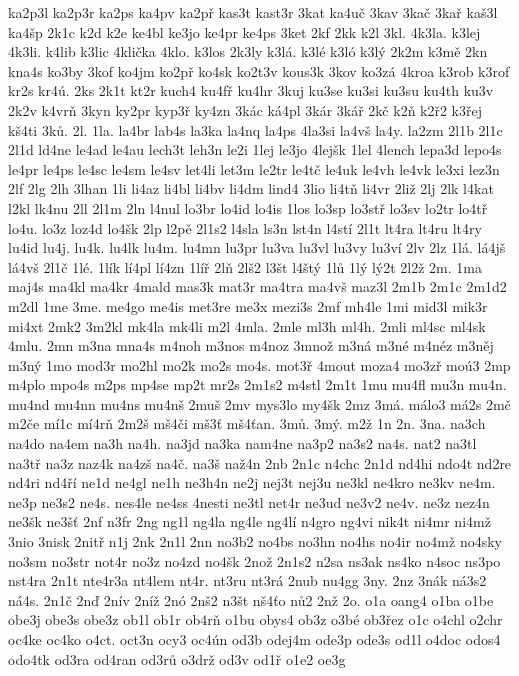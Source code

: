 {ka2p3l
ka2p3r
ka2ps
ka4pv
ka2př
kas3t
kast3r
3kat
ka4uč
3kav
3kač
3kař
kaš3l
ka4šp
2k1c
k2d
k2e
ke4bl
ke3jo
ke4pr
ke4ps
3ket
2kf
2kk
k2l
3kl.
4k3la.
k3lej
4k3li.
k4lib
k3lic
4klička
4klo.
k3los
2k3ly
k3lá.
k3lé
k3ló
k3lý
2k2m
k3mě
2kn
kna4s
ko3by
3kof
ko4jm
ko2př
ko4sk
ko2t3v
kous3k
3kov
ko3zá
4kroa
k3rob
k3rof
kr2s
kr4ú.
2ks
2k1t
kt2r
kuch4
ku4fř
ku4hr
3kuj
ku3se
ku3si
ku3su
ku4th
ku3v
2k2v
k4vrň
3kyn
ky2pr
kyp3ř
ky4zn
3kác
ká4pl
3kár
3kář
2kč
k2ň
k2ř2
k3řej
kš4ti
3ků.
2l.
1la.
la4br
lab4s
la3ka
la4nq
la4ps
4la3si
la4vš
la4y.
la2zm
2l1b
2l1c
2l1d
ld4ne
le4ad
le4au
lech3t
leh3n
le2i
1lej
le3jo
4lejšk
1lel
4lench
lepa3d
lepo4s
le4pr
le4ps
le4sc
le4sm
le4sv
let4li
let3m
le2tr
le4tč
le4uk
le4vh
le4vk
le3xi
lez3n
2lf
2lg
2lh
3lhan
1li
li4az
li4bl
li4bv
li4dm
lind4
3lio
li4tň
li4vr
2liž
2lj
2lk
l4kat
l2kl
lk4nu
2ll
2l1m
2ln
l4nul
lo3br
lo4id
lo4is
1los
lo3sp
lo3stř
lo3sv
lo2tr
lo4tř
lo4u.
lo3z
loz4d
lo4šk
2lp
l2pě
2l1s2
l4sla
ls3n
lst4n
l4stí
2l1t
lt4ra
lt4ru
lt4ry
lu4id
lu4j.
lu4k.
lu4lk
lu4m.
lu4mn
lu3pr
lu3va
lu3vl
lu3vy
lu3ví
2lv
2lz
1lá.
lá4jš
lá4vš
2l1č
1lé.
1lík
lí4pl
lí4zn
1líř
2lň
2lš2
l3št
l4štý
1lů
1lý
lý2t
2l2ž
2m.
1ma
maj4s
ma4kl
ma4kr
4mald
mas3k
mat3r
ma4tra
ma4vš
maz3l
2m1b
2m1c
2m1d2
m2dl
1me
3me.
me4go
me4is
met3re
me3x
mezi3s
2mf
mh4le
1mi
mid3l
mik3r
mi4xt
2mk2
3m2kl
mk4la
mk4li
m2l
4mla.
2mle
ml3h
ml4h.
2mli
ml4sc
ml4sk
4mlu.
2mn
m3na
mna4s
m4noh
m3nos
m4noz
3množ
m3ná
m3né
m4néz
m3něj
m3ný
1mo
mod3r
mo2hl
mo2k
mo2s
mo4s.
mot3ř
4mout
moza4
mo3zř
moú3
2mp
m4plo
mpo4s
m2ps
mp4se
mp2t
mr2s
2m1s2
m4stl
2m1t
1mu
mu4fl
mu3n
mu4n.
mu4nd
mu4nn
mu4ns
mu4nš
2muš
2mv
mys3lo
my4šk
2mz
3má.
málo3
má2s
2mč
m2če
mí1c
mí4rň
2m2š
mš4či
mš3ť
mš4ťan.
3mů.
3mý.
m2ž
1n
2n.
3na.
na3ch
na4do
na4em
na3h
na4h.
na3jd
na3ka
nam4ne
na3p2
na3s2
na4s.
nat2
na3tl
na3tř
na3z
naz4k
na4zš
na4č.
na3š
naž4n
2nb
2n1c
n4chc
2n1d
nd4hi
ndo4t
nd2re
nd4ri
nd4ří
ne1d
ne4gl
ne1h
ne3h4n
ne2j
nej3t
nej3u
ne3kl
ne4kro
ne3kv
ne4m.
ne3p
ne3s2
ne4s.
nes4le
ne4ss
4nesti
ne3tl
net4r
ne3ud
ne3v2
ne4v.
ne3z
nez4n
ne3šk
ne3šť
2nf
n3fr
2ng
ng1l
ng4la
ng4le
ng4lí
n4gro
ng4vi
nik4t
ni4mr
ni4mž
3nio
3nisk
2nitř
n1j
2nk
2n1l
2nn
no3b2
no4bs
no3hn
no4hs
no4ir
no4mž
no4sky
no3sm
no3str
not4r
no3z
no4zd
no4šk
2nož
2n1s2
n2sa
ns3ak
ns4ko
n4soc
ns3po
nst4ra
2n1t
nte4r3a
nt4lem
nt4r.
nt3ru
nt3rá
2nub
nu4gg
3ny.
2nz
3nák
ná3s2
ná4s.
2n1č
2nď
2nív
2níž
2nó
2nš2
n3št
nš4ťo
nů2
2nž
2o.
o1a
oang4
o1ba
o1be
obe3j
obe3s
obe3z
ob1l
ob1r
ob4rň
o1bu
obys4
ob3z
o3bé
ob3řez
o1c
o4chl
o2chr
oc4ke
oc4ko
o4ct.
oct3n
ocy3
oc4ún
od3b
odej4m
ode3p
ode3s
od1l
o4doc
odos4
odo4tk
od3ra
od4ran
od3rů
o3drž
od3v
od1ř
o1e2
oe3g
}

